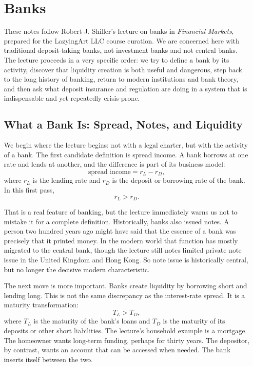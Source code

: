 \chapter{Banks}

These notes follow Robert J. Shiller's lecture on banks in \textit{Financial Markets}, prepared for the LazyingArt LLC course curation. We are concerned here with traditional deposit-taking banks, not investment banks and not central banks. The lecture proceeds in a very specific order: we try to define a bank by its activity, discover that liquidity creation is both useful and dangerous, step back to the long history of banking, return to modern institutions and bank theory, and then ask what deposit insurance and regulation are doing in a system that is indispensable and yet repeatedly crisis-prone.

\section{What a Bank Is: Spread, Notes, and Liquidity}

We begin where the lecture begins: not with a legal charter, but with the activity of a bank. The first candidate definition is spread income. A bank borrows at one rate and lends at another, and the difference is part of its business model:
\begin{equation}
\text{spread income} = r_L - r_D,
\end{equation}
where \(r_L\) is the lending rate and \(r_D\) is the deposit or borrowing rate of the bank. In this first pass,
\begin{equation}
r_L > r_D.
\end{equation}

That is a real feature of banking, but the lecture immediately warns us not to mistake it for a complete definition. Historically, banks also issued notes. A person two hundred years ago might have said that the essence of a bank was precisely that it printed money. In the modern world that function has mostly migrated to the central bank, though the lecture still notes limited private note issue in the United Kingdom and Hong Kong. So note issue is historically central, but no longer the decisive modern characteristic.

The next move is more important. Banks create liquidity by borrowing short and lending long. This is not the same discrepancy as the interest-rate spread. It is a maturity transformation:
\begin{equation}
T_L > T_D,
\end{equation}
where \(T_L\) is the maturity of the bank's loans and \(T_D\) is the maturity of its deposits or other short liabilities. The lecture's household example is a mortgage. The homeowner wants long-term funding, perhaps for thirty years. The depositor, by contrast, wants an account that can be accessed when needed. The bank inserts itself between the two.

